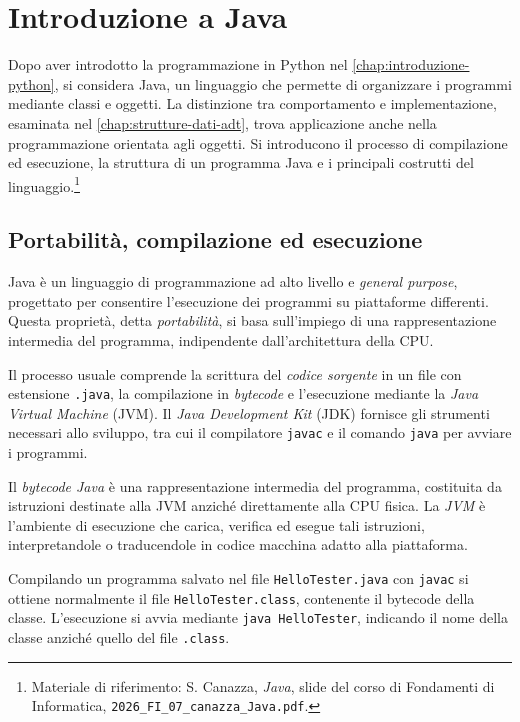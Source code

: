 \chapter{Introduzione a Java}
\label{chap:introduzione-java}

Dopo aver introdotto la programmazione in Python nel
\cref{chap:introduzione-python}, si considera Java, un linguaggio
che permette di organizzare i programmi mediante classi e oggetti.
La distinzione tra comportamento e implementazione, esaminata nel
\cref{chap:strutture-dati-adt}, trova applicazione anche nella
programmazione orientata agli oggetti. Si introducono il processo
di compilazione ed esecuzione, la struttura di un programma Java
e i principali costrutti del linguaggio.\footnote{Materiale
di riferimento: S. Canazza, \emph{Java}, slide del corso di
Fondamenti di Informatica,
\nolinkurl{2026_FI_07_canazza_Java.pdf}.}

\section{Portabilità, compilazione ed esecuzione}
\label{sec:fi-java-esecuzione}

Java è un linguaggio di programmazione ad alto livello e
\emph{general purpose}, progettato per consentire l'esecuzione
dei programmi su piattaforme differenti. Questa proprietà,
detta \emph{portabilità}, si basa sull'impiego di una
rappresentazione intermedia del programma, indipendente
dall'architettura della CPU.

Il processo usuale comprende la scrittura del \emph{codice sorgente}
in un file con estensione \texttt{.java}, la compilazione in
\emph{bytecode} e l'esecuzione mediante la \emph{Java Virtual Machine}
(JVM). Il \emph{Java Development Kit} (JDK) fornisce gli strumenti
necessari allo sviluppo, tra cui il compilatore \texttt{javac}
e il comando \texttt{java} per avviare i programmi.

\begin{definition}
\label{def:fi-java-jvm}
Il \emph{bytecode Java} è una rappresentazione intermedia del
programma, costituita da istruzioni destinate alla JVM anziché
direttamente alla CPU fisica. La \emph{JVM} è l'ambiente di
esecuzione che carica, verifica ed esegue tali istruzioni,
interpretandole o traducendole in codice macchina adatto
alla piattaforma.
\end{definition}

Compilando un programma salvato nel file
\nolinkurl{HelloTester.java} con \texttt{javac} si ottiene
normalmente il file \nolinkurl{HelloTester.class}, contenente
il bytecode della classe. L'esecuzione si avvia mediante
\texttt{java HelloTester}, indicando il nome della classe
anziché quello del file \texttt{.class}.

